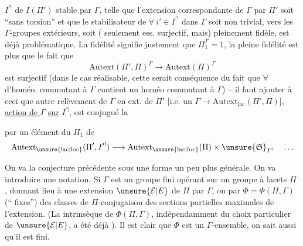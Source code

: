 $I^{\prime!}$ de $I(\Pi')$ stable par $\Gamma$, telle que l'extension correspondante de $\Gamma$ par $\Pi'$ soit ``sans torsion'' et que le stabilisateur de $\forall\ i'\in I^{\prime!}$ dans $\Gamma$ soit non trivial, vers les $\Gamma$-groupes extérieurs, soit ( seulement ess. surjectif, mais) pleinement fidèle, est déjà problématique. La fidélité signifie justement que $\Pi_1^\Gamma=1$, la pleine fidélité est plus  que le fait que 
\[
\mathrm{Autext}(\Pi',\Pi)^\Gamma\longrightarrow\mathrm{Autext}(\Pi)^\Gamma
\]
est surjectif (dans le cas réalisable, cette  serait conséquence du fait que $\forall$  d'homéo. commutant à $\Gamma$ contient un homéo commutant à $\Gamma$)
-- il faut ajouter à ceci que  autre relèvement de $\Gamma$ en  ext. de $\Pi'$ [i.e. un $\Gamma\longrightarrow\mathrm{Autext}_{\mathrm{lac}}(\Pi',\Pi)$],    \uline{action de $\Gamma$} \uline{sur} $I^{\prime!}$, est conjugué  la

 par un élément du  $\Pi_1$ de
\[
\mathrm{Autext}_{\unsure{\mathrm{lac}|\mathrm{loc}}}(\Pi',I^{\prime!})
\longrightarrow
\mathrm{Autext}_{\unsure{\mathrm{lac}|\mathrm{loc}}}(\Pi)
\times \unsure{\mathfrak S}_{I^{\prime!}}\quad\ldots
\]

On va  la conjecture précédente sous une forme un peu plus générale.
On va introduire une notation. Si $\Gamma$ est un groupe fini opérant 
 sur un groupe à lacets $\Pi$ ,
donnant lieu à une extension $\unsure{\mathcal E|E}$ de $\Pi$ par $\Gamma$,
on   par $\Phi=\Phi(\Pi,\Gamma)$ (`` fixes'')
 des classes de $\Pi$-conjugaison des sections partielles
 maximales de l'extension.
(La  intrinsèque de $\Phi(\Pi,\Gamma)$, indépendamment du choix particulier de $\unsure{\mathcal E|E}$, a été déjà ).
Il est clair que $\Phi$ est un $\Gamma$-ensemble, on sait aussi qu'il est fini.

